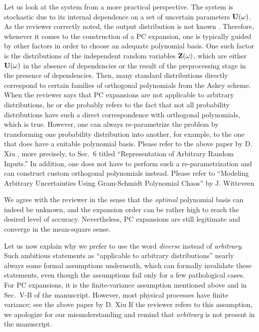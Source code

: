 \begin{authors}
Let us look at the system from a more practical perspective.
The system is stochastic due to its internal dependence on a set of uncertain parameters $\mathbf{U}(\omega)$.
As the reviewer correctly noted, the output distribution is not known \apriori.
Therefore, whenever it comes to the construction of a PC expansion, one is typically guided by other factors in order to choose an adequate polynomial basis.
One such factor is the distributions of the independent random variables $\mathbf{Z}(\omega)$, which are either $\mathbf{U}(\omega)$ in the absence of dependencies or the result of the preprocessing stage in the presence of dependencies.
Then, many standard distributions directly correspond to certain families of orthogonal polynomials from the Askey scheme.
When the reviewer says that PC expansions are not applicable to arbitrary distributions, he or she probably refers to the fact that not all probability distributions have such a direct correspondence with orthogonal polynomials, which is true.
However, one can always re-parametrize the problem by transforming one probability distribution into another, for example, to the one that does have a suitable polynomial basis.
Please refer to the above paper by D. Xiu \etal, more precisely, to Sec.~6 titled ``Representation of Arbitrary Random Inputs.''
In addition, one does not have to perform such a re-parametrization and can construct custom orthogonal polynomials instead.
Please refer to ``Modeling Arbitrary Uncertainties Using Gram-Schmidt Polynomial Chaos'' by J. Witteveen \etal

We agree with the reviewer in the sense that the \emph{optimal} polynomial basis can indeed be unknown, and the expansion order can be rather high to reach the desired level of accuracy.
Nevertheless, PC expansions are still legitimate and converge in the mean-square sense.

Let us now explain why we prefer to use the word \emph{diverse} instead of \emph{arbitrary}.
Such ambitious statements as ``applicable to arbitrary distributions'' nearly always some formal assumptions underneath, which can formally invalidate these statements, even though the assumptions fail only for a few pathological cases.
For PC expansions, it is the finite-variance assumption mentioned above and in Sec.~V-B of the manuscript.
However, most physical processes have finite variance; see the above paper by D. Xiu \etal{}
If the reviewer refers to this assumption, we apologize for our misunderstanding and remind that \emph{arbitrary} is not present in the manuscript.


\end{authors}

